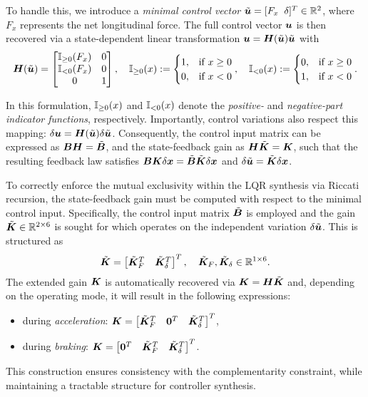 To handle this, we introduce a \emph{minimal control vector} \(\tilde{\boldsymbol{u}} = [F_x\;\; \delta]^T \in \mathbb{R}^2\), where \(F_x\) represents the net longitudinal force. The full control vector $\boldsymbol{u}$ is then recovered via a state-dependent linear transformation $
\boldsymbol{u} = \boldsymbol{H}(\tilde{\boldsymbol{u}}) \tilde{\boldsymbol{u}}$ with
\begin{equation} \label{eq:minimalcontrol}
\bH(\tilde{\bu}) =
\begin{bmatrix}
\Ipos{F_x} & 0 \\
\Ineg{F_x} & 0 \\
0 & 1
\end{bmatrix}, \quad
\Ipos{x} :=
\begin{cases}
1, & \text{if } x \geq 0 \\
0, & \text{if } x < 0
\end{cases}, \quad
\Ineg{x} :=
\begin{cases}
0, & \text{if } x \geq 0 \\
1, & \text{if } x < 0
\end{cases}.
\end{equation}

In this formulation, \(\mathbb{I}_{\geq 0}(x)\) and \(\mathbb{I}_{< 0}(x)\) denote the \emph{positive-} and \emph{negative-part indicator functions}, respectively. Importantly, control variations also respect this mapping: $\delta\boldsymbol{u} = \boldsymbol{H}(\tilde{\boldsymbol{u}}) \delta\tilde{\boldsymbol{u}}$. Consequently, the control input matrix can be expressed as \(\boldsymbol{B} \boldsymbol{H} = \tilde{\boldsymbol{B}}\), and the state-feedback gain as \(\boldsymbol{H} \tilde{\boldsymbol{K}} = \boldsymbol{K}\), such that the resulting feedback law satisfies \(\boldsymbol{B} \boldsymbol{K} \delta\boldsymbol{x} = \tilde{\boldsymbol{B}} \tilde{\boldsymbol{K}} \delta\boldsymbol{x}\) and $\delta \tilde{\boldsymbol{u}} = \tilde{\boldsymbol{K}} \delta \boldsymbol{x}$.

To correctly enforce the mutual exclusivity within the LQR synthesis via Riccati recursion, the state-feedback gain must be computed with respect to the minimal control input. Specifically, the control input matrix $\tilde{\boldsymbol{B}}$ is employed and the gain $\tilde{\boldsymbol{K}} \in \mathbb{R}^{2 \times 6}$ is sought for which operates on the independent variation \(\delta\tilde{\boldsymbol{u}}\). This is structured as
\[
\tilde{\boldsymbol{K}} = \begin{bmatrix} \tilde{\boldsymbol{K}}_F^T & \tilde{\boldsymbol{K}}_\delta^T \end{bmatrix}^T, \quad \tilde{\boldsymbol{K}}_F, \tilde{\boldsymbol{K}}_\delta \in \mathbb{R}^{1 \times 6}.
\]
The extended gain $\boldsymbol{K}$ is automatically recovered via $\boldsymbol{K} = \boldsymbol{H} \tilde{\boldsymbol{K}}$ and, depending on the operating mode, it will result in the following expressions:
\begin{itemize}
  \item during \emph{acceleration}: \(\boldsymbol{K} = \begin{bmatrix} \tilde{\boldsymbol{K}}_F^T & \mathbf{0}^T & \tilde{\boldsymbol{K}}_\delta^T \end{bmatrix}^T\),
  \item during \emph{braking}: \(\boldsymbol{K} = \begin{bmatrix} \mathbf{0}^T & \tilde{\boldsymbol{K}}_F^T & \tilde{\boldsymbol{K}}_\delta^T \end{bmatrix}^T\).
\end{itemize}
This construction ensures consistency with the complementarity constraint, while maintaining a tractable structure for controller synthesis.

